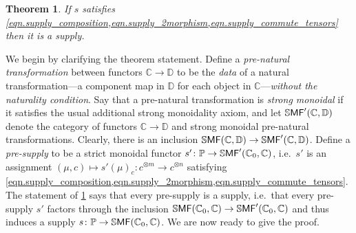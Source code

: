 \documentclass[11pt, oneside, article]{memoir}
\theoremstyle{plain}
\newtheorem{theorem}{Theorem}[chapter] %
\theoremstyle{definition}
\theoremstyle{remark}
\newcommand{\ccat}[1]{\mathbb{#1}}%
\newcommand{\Cat}[1]{{\mathsf{#1}}}%
\newcommand{\CCat}[1]{\mathbb{\StrLeft{#1}{1}}\Cat{\StrGobbleLeft{#1}{1}}}%
\newcommand{\tpow}[1]{^{\otimes #1}}
\newcommand{\ssmf}{\CCat{SMF}}
\newcommand{\cc}{\mathbb{C}}
\newcommand{\dd}{\mathbb{D}}
\newcommand{\pp}{\mathbb{P}}
\newcommand{\mob}[1]{#1_0}
\begin{document}
\begin{theorem}\label{thm.coherence_are_homos}
If $s$ satisfies \cref{eqn.supply_composition,eqn.supply_2morphism,eqn.supply_commute_tensors} then it is a supply.
\end{theorem}
We begin by clarifying the theorem statement. Define a \emph{pre-natural transformation} between functors $\ccat{C}\to\dd$ to be the \emph{data} of a natural transformation---a component map in $\dd$ for each object in $\ccat{C}$---\emph{without the naturality condition}. Say that a pre-natural transformation is \emph{strong monoidal} if it satisfies the usual additional strong monoidality axiom, and let $\ssmf'(\cc,\dd)$ denote the category of functors $\cc\to\dd$ and strong monoidal pre-natural transformations. Clearly, there is an inclusion $\ssmf(\cc,\dd)\to\ssmf'(\cc,\dd)$. Define a \emph{pre-supply} to be a strict monoidal functor $s'\colon\pp\to\ssmf'(\mob{\cc},\cc)$, i.e.\ $s'$ is an assignment $(\mu,c)\mapsto s'(\mu)_c\colon c\tpow{m}\to c\tpow{n}$ satisfying \cref{eqn.supply_composition,eqn.supply_2morphism,eqn.supply_commute_tensors}. The statement of \cref{thm.coherence_are_homos} says that every pre-supply is a supply, i.e.\ that every pre-supply $s'$ factors through the inclusion $\ssmf(\mob{\cc},\cc)\to\ssmf'(\mob{\cc},\cc)$ and thus induces a supply $s\colon\pp\to\ssmf(\mob{\cc},\cc)$. We are now ready to give the proof. 
\end{document}
